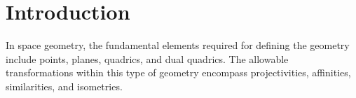 \section{Introduction}

In space geometry, the fundamental elements required for defining the geometry include points, planes, quadrics, and dual quadrics. 
The allowable transformations within this type of geometry encompass projectivities, affinities, similarities, and isometries.